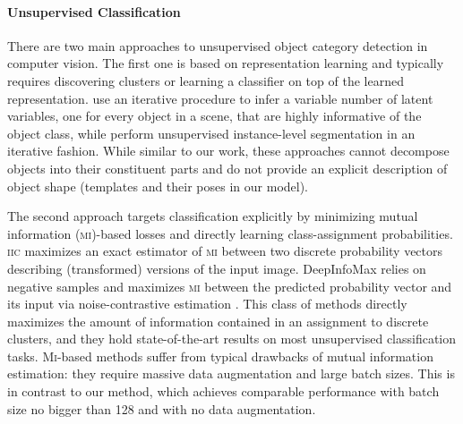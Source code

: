 \documentclass{article}
\begin{document}
\paragraph{Unsupervised Classification}
There are two main approaches to unsupervised object category detection in computer vision.
The first one is based on representation learning and typically requires discovering clusters or learning a classifier on top of the learned representation.
\cite{Eslami2016air,Kosiorek2018sqair} use an iterative procedure to infer a variable number of latent variables, one for every object in a scene, that are highly informative of the object class, while \cite{Greff2019multi,Burgess2019monet} perform unsupervised instance-level segmentation in an iterative fashion.
While similar to our work, these approaches cannot decompose objects into their constituent parts and do not provide an explicit description of object shape (\!\eg templates and their poses in our model).

The second approach targets classification explicitly by minimizing mutual information (\textsc{mi})-based losses and directly learning class-assignment probabilities.
\textsc{iic} \citep{Ji2018iic} maximizes an exact estimator of \textsc{mi} between two discrete probability vectors describing (transformed) versions of the input image.
DeepInfoMax \citep{Hjelm2019deepinfomax} relies on negative samples and maximizes \textsc{mi} between the predicted probability vector and its input via noise-contrastive estimation \citep{Gutmann2010nce}.
This class of methods directly maximizes the amount of information contained in an assignment to discrete clusters, and they hold state-of-the-art results on most unsupervised classification tasks.
\textsc{Mi}-based methods suffer from typical drawbacks of mutual information estimation: they require massive data augmentation and large batch sizes.
This is in contrast to our method, which achieves comparable performance with batch size no bigger than 128 and with no data augmentation.
\end{document}
